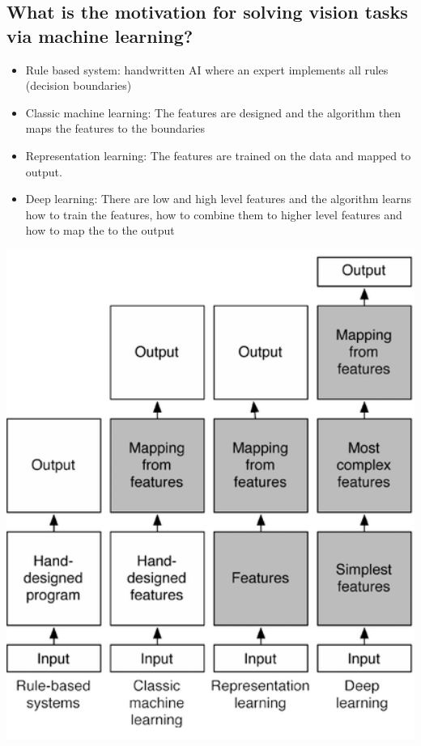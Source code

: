 \subsection{What is the motivation for solving vision tasks via machine learning?}
\begin{minipage}{0.6\textwidth}
\begin{itemize}
\item Rule based system: handwritten AI where an expert implements all rules (decision boundaries)
\item Classic machine learning: The features are designed and the algorithm then maps the features to the boundaries
\item Representation learning: The features are trained on the data and mapped to output.
\item Deep learning: There are low and high level features and the algorithm learns how to train the features, how to combine them to higher level features and how to map the to the output
\end{itemize}
\end{minipage}
\begin{minipage}{0.4\textwidth}\hspace{0.25cm}\includegraphics[width=1.25\textwidth]{./img/motivation.png}
\end{minipage}
